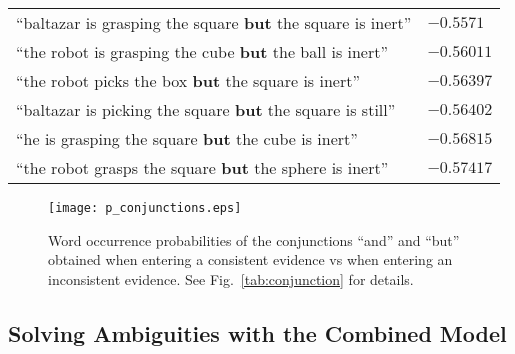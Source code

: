 \begin{figure*}
{{\begin{tabular}{ll}
        ``baltazar is grasping the square \textbf{but} the square is inert''  & $-0.5571$ \\
        ``the robot is grasping the cube \textbf{but} the ball is inert''  & $-0.56011$ \\
        ``the robot picks the box \textbf{but} the square is inert''  & $-0.56397$ \\
        ``baltazar is picking the square \textbf{but} the square is still''  & $-0.56402$ \\
        ``he is grasping the square \textbf{but} the cube is inert''  & $-0.56815$ \\
        ``the robot grasps the square \textbf{but} the sphere is inert''  & $-0.57417$ \\
        \bottomrule
      \end{tabular}%
    } %
    \label{tab:conjunction:but}
  } %
    \caption{$10$-best list of sentences generated given two different sets of evidence.
    In~(a) the model interprets the object movement as indicating a succesful grasp and uses the conjunction ``and''.
    In~(b) the slow movement is interpreted as no movement at all, and, therefore, as an unsuccessful grasp: as a result, the conjunction ``but'' is used.}
    \label{tab:conjunction}
\end{figure*}


\begin{figure}
\centering
\texttt{[image: p\_conjunctions.eps]}
\caption{Word occurrence probabilities of the conjunctions ``and'' and ``but'' obtained when entering a consistent \actioneffect{} evidence vs when entering an inconsistent \actioneffect{} evidence. See Fig.~\ref{tab:conjunction} for details.}
\label{fig:p_conjunctions}
\end{figure}

\subsection{Solving Ambiguities with the Combined Model}

